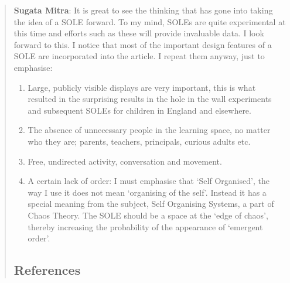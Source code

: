 \begin{quote}
\textbf{Sugata Mitra}: It is great to see the thinking that has gone
into taking the idea of a SOLE forward. To my mind, SOLEs are quite
experimental at this time and efforts such as these will provide
invaluable data. I look forward to this. I notice that most of the
important design features of a SOLE are incorporated into the article. I
repeat them anyway, just to emphasise:

\begin{enumerate}
\def\labelenumi{\arabic{enumi}.}
\item
  Large, publicly visible displays are very important, this is what
  resulted in the surprising results in the hole in the wall experiments
  and subsequent SOLEs for children in England and elsewhere.
\item
  The absence of unnecessary people in the learning space, no matter who
  they are; parents, teachers, principals, curious adults etc.
\item
  Free, undirected activity, conversation and movement.
\item
  A certain lack of order: I must emphasise that `Self Organised', the
  way I use it does not mean `organising of the self'. Instead it has a
  special meaning from the subject, Self Organising Systems, a part of
  Chaos Theory. The SOLE should be a space at the `edge of chaos',
  thereby increasing the probability of the appearance of `emergent
  order'.
\end{enumerate}

\subsection{References}\label{sole-references}
\end{quote}

